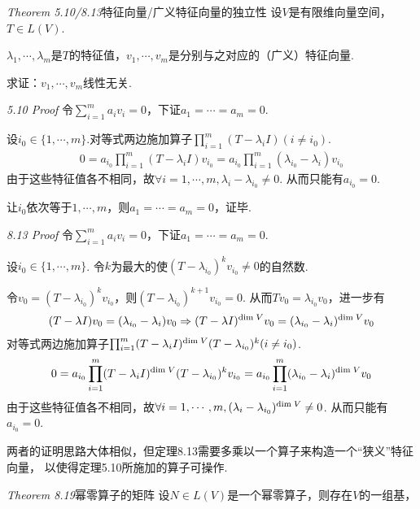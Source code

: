 \textit{Theorem 5.10/8.13}{\kaishu 特征向量/广义特征向量的独立性}
设\(V\)是有限维向量空间，\(T \in L(V)\).

\(\lambda_1,\cdots,\lambda_m\)是\(T\)的特征值，\(v_1,\cdots,v_m\)是分别与之对应的（广义）特征向量.

求证：\(v_1,\cdots,v_m\)线性无关.

\textit{5.10 Proof}
令\(\sum_{i=1}^m a_iv_i=0\)，下证\(a_1=\cdots=a_m=0\).

设\(i_0 \in \{1,\cdots,m\}\).对等式两边施加算子\(\prod_{i=1}^m (T-\lambda_i I)(i \ne i_0)\).
    \begin{align*}
        0=a_{i_0}\prod_{i=1}^m (T-\lambda_i I) v_{i_0}=
        a_{i_0}\prod_{i=1}^m (\lambda_{i_0}-\lambda_i) v_{i_0}
    \end{align*}
由于这些特征值各不相同，故\(\forall i=1,\cdots,m,\lambda_i-\lambda_{i_0} \ne 0\).
从而只能有\(a_{i_0}=0\).

让\(i_0\)依次等于\(1,\cdots,m\)，则\(a_1=\cdots=a_m=0\)，证毕.

\textit{8.13 Proof}
令\(\sum_{i=1}^m a_iv_i=0\)，下证\(a_1=\cdots=a_m=0\).

设\(i_0 \in \{1,\cdots,m\}\).
令\(k\)为最大的使\((T-\lambda_{i_0})^k v_{i_0} \ne 0\)的自然数.

令\(v_0=(T-\lambda_{i_0})^k v_{i_0}\)，则\((T-\lambda_{i_0})^{k+1} v_{i_0}=0\).
从而\(Tv_0=\lambda_{i_0}v_0\)，进一步有
    \begin{align*}
        (T-\lambda I)v_0=(\lambda_{i_0}-\lambda_i)v_0 \Rightarrow 
        (T-\lambda I)^{\mathrm{dim \;} V} v_0=(\lambda_{i_0}-\lambda_i)^{\mathrm{dim \;} V}v_0
    \end{align*}
对等式两边施加算子\(\prod_{i=1}^m (T-\lambda_i I)^{\mathrm{dim \;} V}(T-\lambda_{i_0})^k(i \ne i_0)\).
    \begin{align*}
        0=a_{i_0}\prod_{i=1}^m (T-\lambda_i I)^{\mathrm{dim \;} V}(T-\lambda_{i_0})^k v_{i_0}
        =a_{i_0}\prod_{i=1}^m (\lambda_{i_0}-\lambda_i)^{\mathrm{dim \;} V} v_0
    \end{align*}
由于这些特征值各不相同，故\(\forall i=1,\cdots,m,(\lambda_i-\lambda_{i_0})^{\mathrm{dim \;} V} \ne 0\).
从而只能有\(a_{i_0}=0\).

两者的证明思路大体相似，但定理8.13需要多乘以一个算子来构造一个“狭义”特征向量，
以使得定理5.10所施加的算子可操作.

\hspace*{\fill}

\textit{Theorem 8.19}{\kaishu 幂零算子的矩阵}
设\(N \in L(V)\)是一个幂零算子，则存在\(V\)的一组基，

